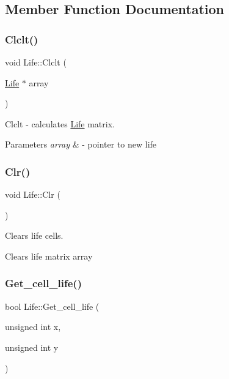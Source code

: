 \subsection{Member Function Documentation}
\mbox{\label{class_life_a64d3039888e089796f81926ef13324d1}} 
\subsubsection{\texorpdfstring{Clclt()}{Clclt()}}
{\footnotesize\ttfamily void Life\+::\+Clclt (\begin{DoxyParamCaption}\item[{\mbox{\hyperlink{class_life}{Life}} $\ast$}]{array }\end{DoxyParamCaption})}



Clclt -\/ calculates \mbox{\hyperlink{class_life}{Life}} matrix. 


\begin{DoxyParams}{Parameters}
{\em array} & -\/ pointer to new life \\
\hline
\end{DoxyParams}
\mbox{\label{class_life_a7ec128155eec1c792ca8c529f2b3a44d}} 
\subsubsection{\texorpdfstring{Clr()}{Clr()}}
{\footnotesize\ttfamily void Life\+::\+Clr (\begin{DoxyParamCaption}{ }\end{DoxyParamCaption})}



Clears life cells. 

Clears life matrix array \mbox{\label{class_life_a9e4be3de8f40459707402d2744eaac90}} 
\subsubsection{\texorpdfstring{Get\+\_\+cell\+\_\+life()}{Get\_cell\_life()}}
{\footnotesize\ttfamily bool Life\+::\+Get\+\_\+cell\+\_\+life (\begin{DoxyParamCaption}\item[{unsigned int}]{x,  }\item[{unsigned int}]{y }\end{DoxyParamCaption})}



